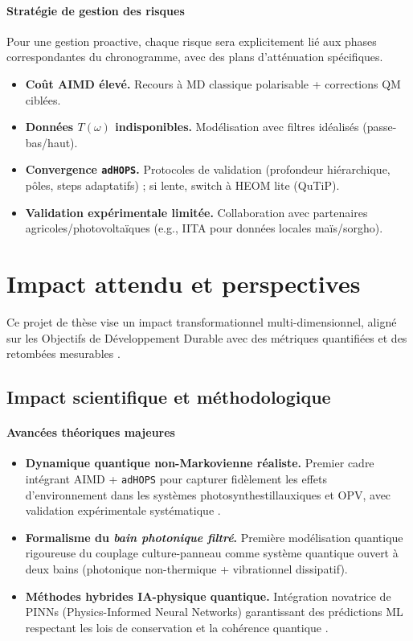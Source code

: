 \documentclass[12pt, a4paper]{article}
\begin{document}
\paragraph{Stratégie de gestion des risques}
Pour une gestion proactive, chaque risque sera explicitement lié aux phases correspondantes du chronogramme, avec des plans d'atténuation spécifiques.
\begin{itemize}
    \item \textbf{Coût AIMD élevé.} Recours à MD classique polarisable + corrections QM ciblées.
    \item \textbf{Données $T(\omega)$ indisponibles.} Modélisation avec filtres idéalisés (passe-bas/haut).
    \item \textbf{Convergence \texttt{adHOPS}.} Protocoles de validation (profondeur hiérarchique, pôles, steps adaptatifs) ; si lente, switch à HEOM lite (QuTiP).
    \item \textbf{Validation expérimentale limitée.} Collaboration avec partenaires agricoles/photovoltaïques (e.g., IITA pour données locales maïs/sorgho).
\end{itemize}

\section{Impact attendu et perspectives}

Ce projet de thèse vise un impact transformationnel multi-dimensionnel, aligné sur les Objectifs de Développement Durable avec des métriques quantifiées et des retombées mesurables \cite{Rapella2025}.

\subsection{Impact scientifique et méthodologique}

\paragraph{Avancées théoriques majeures}
\begin{itemize}
    \item \textbf{Dynamique quantique non-Markovienne réaliste.} Premier cadre intégrant AIMD + \texttt{adHOPS} pour capturer fidèlement les effets d'environnement dans les systèmes photosynthestillauxiques et OPV, avec validation expérimentale systématique \cite{Ciszak2024, Dutta2024}.
    
    \item \textbf{Formalisme du \textit{bain photonique filtré}.} Première modélisation quantique rigoureuse du couplage culture-panneau comme système quantique ouvert à deux bains (photonique non-thermique + vibrationnel dissipatif).
    
    \item \textbf{Méthodes hybrides IA-physique quantique.} Intégration novatrice de PINNs (Physics-Informed Neural Networks) garantissant des prédictions ML respectant les lois de conservation et la cohérence quantique \cite{Dan2024, Seneviratne2024}.
\end{itemize}
\end{document}
